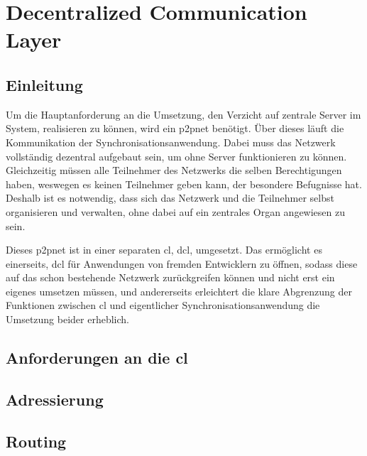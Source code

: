 \chapter{Decentralized Communication Layer}
\renewcommand{\kapitelautor}{Autor: Martin Exner}

\section{Einleitung}
Um die Hauptanforderung an die Umsetzung, den Verzicht auf zentrale Server im System, realisieren zu können,
wird ein \gls{p2pnet} benötigt. Über dieses läuft die Kommunikation der Synchronisationsanwendung.
Dabei muss das Netzwerk vollständig dezentral aufgebaut sein, um ohne Server funktionieren zu können.
Gleichzeitig müssen alle Teilnehmer des Netzwerks die selben Berechtigungen haben, weswegen es keinen
Teilnehmer geben kann, der besondere Befugnisse hat. Deshalb ist es notwendig, dass sich das Netzwerk
und die Teilnehmer selbst organisieren und verwalten, ohne dabei auf ein zentrales Organ angewiesen
zu sein.

Dieses \gls{p2pnet} ist in einer separaten \gls{cl}, \gls{dcl}, umgesetzt.
Das ermöglicht es einerseits, \gls{dcl} für Anwendungen von fremden Entwicklern zu öffnen, sodass diese auf das schon bestehende Netzwerk
zurückgreifen können und nicht erst ein eigenes umsetzen müssen, und andererseits erleichtert die klare Abgrenzung der Funktionen
zwischen \gls{cl} und eigentlicher Synchronisationsanwendung die Umsetzung beider erheblich.

\section{Anforderungen an die \gls{cl}}


\section{Adressierung}


\section{Routing}

